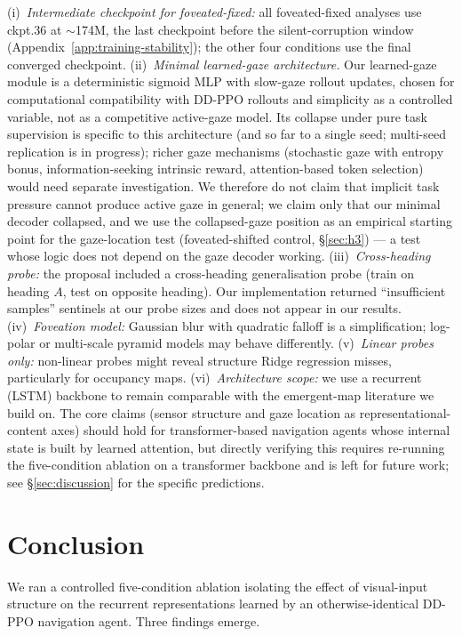 \documentclass{article}
\begin{document}
(i)~\emph{Intermediate checkpoint for foveated-fixed:} all foveated-fixed analyses use ckpt.36 at $\sim$174M, the last checkpoint before the silent-corruption window (Appendix~\ref{app:training-stability}); the other four conditions use the final converged checkpoint. (ii)~\emph{Minimal learned-gaze architecture.} Our learned-gaze module is a deterministic sigmoid MLP with slow-gaze rollout updates, chosen for computational compatibility with DD-PPO rollouts and simplicity as a controlled variable, not as a competitive active-gaze model. Its collapse under pure task supervision is specific to this architecture (and so far to a single seed; multi-seed replication is in progress); richer gaze mechanisms (stochastic gaze with entropy bonus, information-seeking intrinsic reward, attention-based token selection) would need separate investigation. We therefore do not claim that implicit task pressure cannot produce active gaze in general; we claim only that our minimal decoder collapsed, and we use the collapsed-gaze position as an empirical starting point for the gaze-location test (foveated-shifted control, §\ref{sec:h3}) --- a test whose logic does not depend on the gaze decoder working. (iii)~\emph{Cross-heading probe:} the proposal included a cross-heading generalisation probe (train on heading $A$, test on opposite heading). Our implementation returned ``insufficient samples'' sentinels at our probe sizes and does not appear in our results. (iv)~\emph{Foveation model:} Gaussian blur with quadratic falloff is a simplification; log-polar or multi-scale pyramid models may behave differently. (v)~\emph{Linear probes only:} non-linear probes might reveal structure Ridge regression misses, particularly for occupancy maps. (vi)~\emph{Architecture scope:} we use a recurrent (LSTM) backbone to remain comparable with the emergent-map literature we build on. The core claims (sensor structure and gaze location as representational-content axes) should hold for transformer-based navigation agents whose internal state is built by learned attention, but directly verifying this requires re-running the five-condition ablation on a transformer backbone and is left for future work; see §\ref{sec:discussion} for the specific predictions.


\section{Conclusion}

We ran a controlled five-condition ablation isolating the effect of visual-input structure on the recurrent representations learned by an otherwise-identical DD-PPO navigation agent. Three findings emerge.
\end{document}
